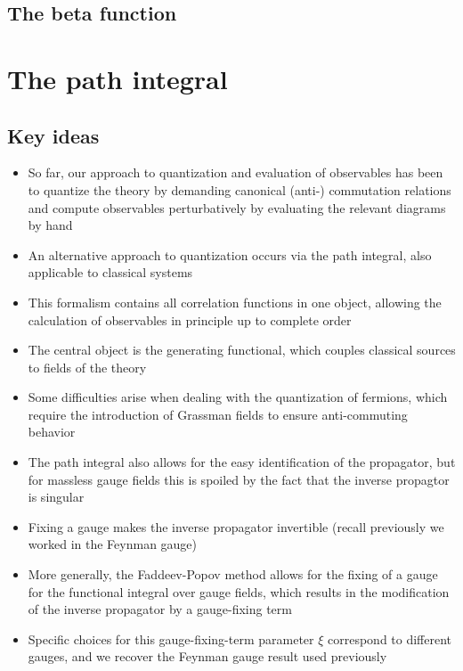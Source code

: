 \documentclass[12pt]{memoir}
\begin{document}
\section{The beta function}

\chapter{The path integral}

\section{Key ideas}

\begin{itemize}
  \item So far, our approach to quantization and evaluation of observables has been
    to quantize the theory by demanding canonical (anti-) commutation relations
    and compute observables perturbatively by evaluating the relevant diagrams by hand
  \item An alternative approach to quantization occurs via the path integral,
    also applicable to classical systems
  \item This formalism contains all correlation functions in one object,
    allowing the calculation of observables in principle up to complete order
  \item The central object is the generating functional,
    which couples classical sources to fields of the theory
  \item Some difficulties arise when dealing with the quantization of fermions,
    which require the introduction of Grassman fields to ensure anti-commuting behavior
  \item The path integral also allows for the easy identification of the propagator,
    but for massless gauge fields this is spoiled by the fact that the inverse propagtor is singular
  \item Fixing a gauge makes the inverse propagator invertible (recall previously we worked in the Feynman gauge)
  \item More generally, the Faddeev-Popov method allows for the fixing of a gauge
    for the functional integral over gauge fields,
    which results in the modification of the inverse propagator by a gauge-fixing term
  \item Specific choices for this gauge-fixing-term parameter $\xi$ correspond to different gauges,
    and we recover the Feynman gauge result used previously
\end{itemize}
\end{document}

